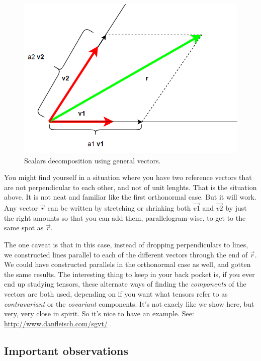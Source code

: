 \documentclass[
]{book}
\begin{document}
\begin{figure}

{\centering \includegraphics[width=0.75\linewidth,height=0.75\textheight]{images/parallelogram-decomposition} 

}

\caption{Scalars decomposition using general vectors.}\label{fig:unnamed-chunk-8}
\end{figure}

You might find yourself in a situation where you have two reference vectors that are not perpendicular to each other, and not of unit lenghts. That is the situation above. It is not neat and familiar like the first orthonormal case. But it will work. Any vector \(\vec{r}\) can be written by stretching or shrinking both \(\vec{v1}\) and \(\vec{v2}\) by just the right amounts so that you can add them, parallelogram-wise, to get to the same spot as \(\vec{r}\).

The one caveat is that in this case, instead of dropping perpendiculars to lines, we constructed lines parallel to each of the different vectors through the end of \(\vec{r}\). We could have constructed parallels in the orthonormal case as well, and gotten the same results. The interesting thing to keep in your back pocket is, if you ever end up studying tensors, these alternate ways of finding the \emph{components} of the vectors are both used, depending on if you want what tensors refer to as \emph{contravariant} or the \emph{covariant} components. It's not exacly like we show here, but very, very close in spirit. So it's nice to have an example. See: \url{http://www.danfleisch.com/sgvt/} .

\hypertarget{important-observations}{%
\subsection{Important observations}\label{important-observations}}
\end{document}
